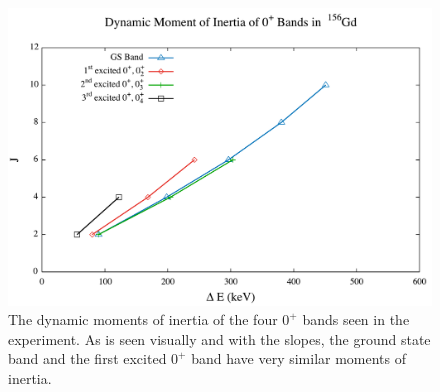 \begin{figure}[!]
    \centering
    \includegraphics[scale=0.45]{Discussion/156_Dynamic0.pdf}
    \caption{The dynamic moments of inertia of the four $0^+$ bands seen in the experiment. As is seen visually and with the slopes, the ground state band and the first excited $0^+$ band have very similar moments of inertia.}
    \label{fig:156_Dynamic0}
\end{figure}